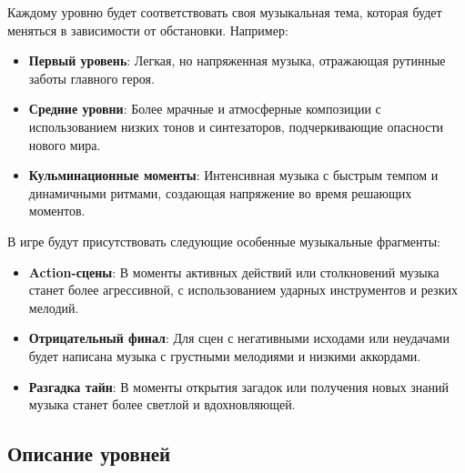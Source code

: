 \documentclass{article}
\begin{document}
	Каждому уровню будет соответствовать своя музыкальная тема, которая будет меняться в зависимости от обстановки. Например:
	\begin{itemize}
		\item \textbf{Первый уровень}: Легкая, но напряженная музыка, отражающая рутинные заботы главного героя.
		\item \textbf{Средние уровни}: Более мрачные и атмосферные композиции с использованием низких тонов и синтезаторов, подчеркивающие опасности нового мира.
		\item \textbf{Кульминационные моменты}: Интенсивная музыка с быстрым темпом и динамичными ритмами, создающая напряжение во время решающих моментов.
	\end{itemize}
	
	В игре будут присутствовать следующие особенные музыкальные фрагменты:
	\begin{itemize}
		\item \textbf{Action-сцены}: В моменты активных действий или столкновений музыка станет более агрессивной, с использованием ударных инструментов и резких мелодий.
		\item \textbf{Отрицательный финал}: Для сцен с негативными исходами или неудачами будет написана музыка с грустными мелодиями и низкими аккордами.
		\item \textbf{Разгадка тайн}: В моменты открытия загадок или получения новых знаний музыка станет более светлой и вдохновляющей.
	\end{itemize}
	
	\subsection{Описание уровней}
	
\end{document}
